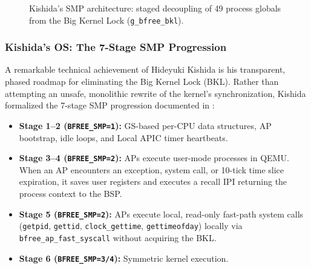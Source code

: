 \documentclass[10pt,journal,compsoc,twocolumn]{article}
\begin{document}
\begin{figure}[t]
\centering
{}
\caption{Kishida's SMP architecture: staged decoupling of 49 process globals from the Big Kernel Lock (\texttt{g\_bfree\_bkl}).}
\label{fig:urara_smp}
\end{figure}

\subsubsection{Kishida's OS: The 7-Stage SMP Progression}
A remarkable technical achievement of Hideyuki Kishida is his transparent, phased roadmap for eliminating the Big Kernel Lock (BKL). Rather than attempting an unsafe, monolithic rewrite of the kernel's synchronization, Kishida formalized the 7-stage SMP progression documented in :
\begin{itemize}[leftmargin=*]
    \item \textbf{Stage 1--2 (\texttt{BFREE\_SMP=1}):} GS-based per-CPU data structures, AP bootstrap, idle loops, and Local APIC timer heartbeats.
    \item \textbf{Stage 3--4 (\texttt{BFREE\_SMP=2}):} APs execute user-mode processes in QEMU. When an AP encounters an exception, system call, or 10-tick time slice expiration, it saves user registers and executes a recall IPI returning the process context to the BSP.
    \item \textbf{Stage 5 (\texttt{BFREE\_SMP=2}):} APs execute local, read-only fast-path system calls (\texttt{getpid}, \texttt{gettid}, \texttt{clock\_gettime}, \texttt{gettimeofday}) locally via \texttt{bfree\_ap\_fast\_syscall} without acquiring the BKL.
    \item \textbf{Stage 6 (\texttt{BFREE\_SMP=3/4}):} Symmetric kernel execution.
\end{itemize}
\end{document}
